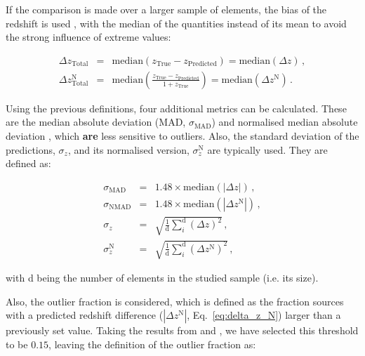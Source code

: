 \documentclass{aa}
\begin{document}
If the comparison is made over a larger sample of elements, the bias of the redshift is used \citep{2013ApJ...775...93D}, with the median of the quantities instead of its mean to avoid the strong influence of extreme values:

\begin{eqnarray}
\Delta z_{\mathrm{Total}} &=& \mathrm{median}\left(z_{\mathrm{True}} - z_{\mathrm{Predicted}}\right) = \mathrm{median}(\Delta z)\,,\\
\Delta z_{\mathrm{Total}}^{\mathrm{N}} &=& \mathrm{median}\left(\frac{z_{\mathrm{True}} - z_{\mathrm{Predicted}}}{1 + z_{\mathrm{True}}}\right) = \mathrm{median}(\Delta z^{\mathrm{N}})\,.
\end{eqnarray}

Using the previous definitions, four additional metrics can be calculated. These are the median absolute deviation (MAD, $\sigma_{\mathrm{MAD}}$) and normalised median absolute deviation \citep[NMAD, $\sigma_{\mathrm{NMAD}}$;][]{hoaglin1983understanding, 2009ApJ...690.1236I}, which \textbf{are} less sensitive to outliers. Also, the standard deviation of the predictions, $\sigma_{z}$, and its normalised version, $\sigma_{z}^{\mathrm{N}}$ are typically used. They are defined as:

\begin{eqnarray}
\sigma_{\mathrm{MAD}} &=& 1.48 \times \mathrm{median}\left(|\Delta z|\right)\,,\\
\sigma_{\mathrm{NMAD}} &=& 1.48 \times \mathrm{median}\left(\left|\Delta z^{\mathrm{N}}\right|\right)\,,\\
\sigma_{z} &=& \sqrt{\frac{1}{\mathrm{d}} \sum_{i}^{\mathrm{d}} \left(\Delta z\right)^{2}}\,,\\
\sigma_{z}^{\mathrm{N}} &=& \sqrt{\frac{1}{\mathrm{d}} \sum_{i}^{\mathrm{d}} \left(\Delta z^{\mathrm{N}}\right)^{2}}\,,
\end{eqnarray}

\noindent with d being the number of elements in the studied sample (i.e. its size).

Also, the outlier fraction \citep[$\eta$, as used in][]{2013ApJ...775...93D, 2022A&C....3800510L} is considered, which is defined as the fraction sources with a predicted redshift difference ($\left|\Delta z^{\mathrm{N}}\right|$, Eq.~\ref{eq:delta_z_N}) larger than a previously set value. Taking the results from \citet{2009ApJ...690.1236I} and \citet{2010A&A...523A..31H}, we have selected this threshold to be $0.15$, leaving the definition of the outlier fraction as:
\end{document}
